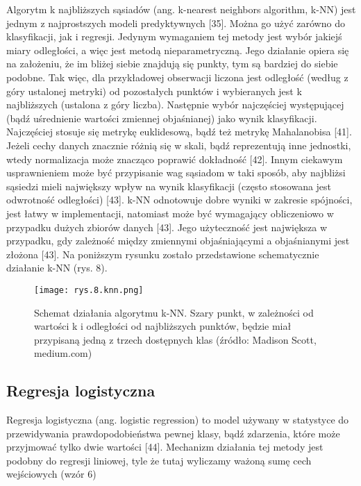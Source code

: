 Algorytm k najbliższych sąsiadów (ang. k-nearest neighbors algorithm, k-NN) jest jednym z najprostszych modeli predyktywnych [35]. Można go użyć zarówno do klasyfikacji, jak i regresji. Jedynym wymaganiem tej metody jest wybór jakiejś miary odległości, a więc jest metodą nieparametryczną. Jego działanie opiera się na założeniu, że im bliżej siebie znajdują się punkty, tym są bardziej do siebie podobne. Tak więc, dla przykładowej obserwacji liczona jest odległość (według z góry ustalonej metryki) od pozostałych punktów i wybieranych jest k najbliższych (ustalona z góry liczba). Następnie wybór najczęściej występującej (bądź uśrednienie wartości zmiennej objaśnianej) jako wynik klasyfikacji. Najczęściej stosuje się metrykę euklidesową, bądź też metrykę Mahalanobisa [41]. Jeżeli cechy danych znacznie różnią się w skali, bądź reprezentują inne jednostki, wtedy normalizacja może znacząco poprawić dokładność [42]. Innym ciekawym usprawnieniem może być przypisanie wag sąsiadom w taki sposób, aby najbliżsi sąsiedzi mieli największy wpływ na wynik klasyfikacji (często stosowana jest odwrotność odległości) [43]. k-NN odnotowuje dobre wyniki w zakresie spójności, jest łatwy w implementacji, natomiast może być wymagający obliczeniowo w przypadku dużych zbiorów danych [43]. Jego użyteczność jest największa w przypadku, gdy zależność między zmiennymi objaśniającymi a objaśnianymi jest złożona [43]. Na poniższym rysunku zostało przedstawione schematycznie działanie k-NN (rys. 8). 



\begin{figure}[h]
    \centering
    \texttt{[image: rys.8.knn.png]}
    \caption{Schemat działania algorytmu k-NN. Szary punkt, w zależności od wartości k i odległości od najbliższych punktów, będzie miał przypisaną jedną z trzech dostępnych klas (źródło: Madison Scott, medium.com)}
    \label{fig:mesh8}
\end{figure}

\subsection{Regresja logistyczna}
\label{Regresja logistyczna}

Regresja logistyczna (ang. logistic regression) to model używany w statystyce do przewidywania prawdopodobieństwa pewnej klasy, bądź zdarzenia, które może przyjmować tylko dwie wartości [44]. Mechanizm działania tej metody jest podobny do regresji liniowej, tyle że tutaj wyliczamy ważoną sumę cech wejściowych (wzór 6)




